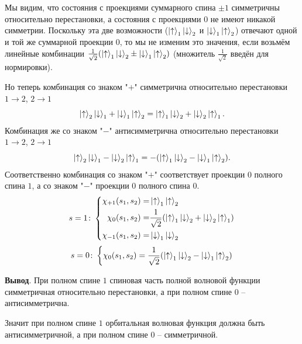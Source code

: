 Мы видим, что состояния с проекциями суммарного спина $\pm 1$ симметричны относительно перестановки, а состояния с проекциями $0$ не имеют никакой симметрии. Поскольку эта две возможности ($\left|\uparrow\right\rangle_1 \left|\downarrow\right\rangle_2$ и $\left|\downarrow\right\rangle_1 \left|\uparrow\right\rangle_2$) отвечают одной и той же суммарной проекции $0$, то мы не изменим это значения, если возьмём линейные комбинации $\frac{1}{\sqrt{2}}(\left|\uparrow\right\rangle_1 \left|\downarrow\right\rangle_2 \pm \left|\downarrow\right\rangle_1 \left|\uparrow\right\rangle_2)$ (множитель $\frac{1}{\sqrt{2}}$ введён для нормировки).

Но теперь комбинация со знаком "$+$" симметрична относительно перестановки $1 \to 2$, $2 \to 1$
\begin{equation*}
	\left|\uparrow\right\rangle_2 \left|\downarrow\right\rangle_1 + \left|\downarrow\right\rangle_1 \left|\uparrow\right\rangle_2 = \left|\uparrow\right\rangle_1 \left|\downarrow\right\rangle_2 + \left|\downarrow\right\rangle_2 \left|\uparrow\right\rangle_1.
\end{equation*}
Комбинация же со знаком "$-$" антисимметрична относительно перестановки $1 \to 2$, $2 \to 1$
\begin{equation*}
	\left|\uparrow\right\rangle_2 \left|\downarrow\right\rangle_1 - \left|\downarrow\right\rangle_2 \left|\uparrow\right\rangle_1 = -(\left|\uparrow\right\rangle_1 \left|\downarrow\right\rangle_2 - \left|\downarrow\right\rangle_1 \left|\uparrow\right\rangle_2).
\end{equation*}
Соответственно комбинация со знаком "$+$" соответствует проекции $0$ полного спина $1$, а со знаком "$-$" проекции $0$ полного спина $0$.
\begin{equation*}
	s=1\colon
	\left\{
	\begin{aligned}
		\chi_{+1} (s_1, s_2) =& \left|\uparrow\right\rangle_1 \left|\uparrow\right\rangle_2\\
		\chi_0 (s_1, s_2) =& \frac{1}{\sqrt{2}} (\left|\uparrow\right\rangle_1 \left|\downarrow\right\rangle_2 + \left|\downarrow\right\rangle_2 \left|\uparrow\right\rangle_1)\\
		\chi_{-1}(s_1, s_2) =& \left|\downarrow\right\rangle_1 \left|\downarrow\right\rangle_2
	\end{aligned}
	\right.
\end{equation*}
\begin{equation*}
	s = 0 \colon \left\{ \chi_0(s_1, s_2) = \frac{1}{\sqrt{2}} (\left|\uparrow\right\rangle_1 \left|\downarrow\right\rangle_2 - \left|\downarrow\right\rangle_1 \left|\uparrow\right\rangle_2)\right.
\end{equation*}

\textbf{Вывод}. При полном спине $1$ спиновая часть полной волновой функции  симметричная относительно перестановки, а при полном спине $0$ -- антисимметрична.

Значит при полном спине $1$ орбитальная волновая функция должна быть антисимметричной, а при полном спине $0$ -- симметричной.

